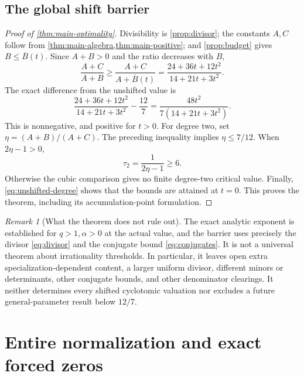 \documentclass[11pt]{article}
\numberwithin{equation}{section}
\theoremstyle{definition}
\theoremstyle{remark}
\newtheorem{remark}[remark]{Remark}
\begin{document}
\subsection{The global shift barrier}

\begin{proof}[Proof of \cref{thm:main-optimality}]
Divisibility is \cref{prop:divisor}; the constants $A,C$ follow from
\cref{thm:main-algebra,thm:main-positive}; and \cref{prop:budget} gives
$B\le\overline B(t)$. Since $A+B>0$ and the ratio decreases with $B$,
\[
 \frac{A+C}{A+B}\ge\frac{A+C}{A+\overline B(t)}
 =\frac{24+36t+12t^2}{14+21t+3t^2}.
\]
The exact difference from the unshifted value is
\begin{equation}\label{eq:strict-gap}
 \frac{24+36t+12t^2}{14+21t+3t^2}-\frac{12}{7}
 =\frac{48t^2}{7(14+21t+3t^2)}.
\end{equation}
This is nonnegative, and positive for $t>0$.
For degree two, set $\eta=(A+B)/(A+C)$. The preceding inequality implies
$\eta\le7/12$. When $2\eta-1>0$,
\[
 \tau_2=\frac1{2\eta-1}\ge6.
\]
Otherwise the cubic comparison gives no finite degree-two critical value.
Finally, \eqref{eq:unshifted-degree} shows that the bounds are attained at
$t=0$. This proves the theorem, including its accumulation-point formulation.
\end{proof}

\begin{remark}[What the theorem does not rule out]\label{rem:scope}
The exact analytic exponent is established for $q>1,\alpha>0$ at the actual
value, and the barrier uses precisely the divisor \eqref{eq:divisor} and
the conjugate bound \eqref{eq:conjugates}. It is not a universal theorem
about irrationality thresholds. In particular, it leaves open extra
specialization-dependent content, a larger uniform divisor, different
minors or determinants, other conjugate bounds, and other denominator
clearings. It neither determines every shifted cyclotomic valuation nor
excludes a future general-parameter result below $12/7$.
\end{remark}

\section{Entire normalization and exact forced zeros}
\label{sec:entire-normalization}
\end{document}
